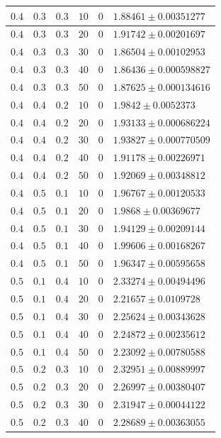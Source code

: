 \documentclass[14pt]{extreport}
\begin{document}
\begin{center}
\begin{longtable}{|p{1cm}|p{1cm}|p{1cm}|p{1cm}|p{1cm}|p{8cm}|}
$0.4$ & $0.3$ & $0.3$ & $10$ & $0$ & $1.88461 \pm 0.00351277$ \\ \hline
$0.4$ & $0.3$ & $0.3$ & $20$ & $0$ & $1.91742 \pm 0.00201697$ \\ \hline
$0.4$ & $0.3$ & $0.3$ & $30$ & $0$ & $1.86504 \pm 0.00102953$ \\ \hline
$0.4$ & $0.3$ & $0.3$ & $40$ & $0$ & $1.86436 \pm 0.000598827$ \\ \hline
$0.4$ & $0.3$ & $0.3$ & $50$ & $0$ & $1.87625 \pm 0.000134616$ \\ \hline
$0.4$ & $0.4$ & $0.2$ & $10$ & $0$ & $1.9842 \pm 0.0052373$ \\ \hline
$0.4$ & $0.4$ & $0.2$ & $20$ & $0$ & $1.93133 \pm 0.000686224$ \\ \hline
$0.4$ & $0.4$ & $0.2$ & $30$ & $0$ & $1.93827 \pm 0.000770509$ \\ \hline
$0.4$ & $0.4$ & $0.2$ & $40$ & $0$ & $1.91178 \pm 0.00226971$ \\ \hline
$0.4$ & $0.4$ & $0.2$ & $50$ & $0$ & $1.92069 \pm 0.00348812$ \\ \hline
$0.4$ & $0.5$ & $0.1$ & $10$ & $0$ & $1.96767 \pm 0.00120533$ \\ \hline
$0.4$ & $0.5$ & $0.1$ & $20$ & $0$ & $1.9868 \pm 0.00369677$ \\ \hline
$0.4$ & $0.5$ & $0.1$ & $30$ & $0$ & $1.94129 \pm 0.00209144$ \\ \hline
$0.4$ & $0.5$ & $0.1$ & $40$ & $0$ & $1.99606 \pm 0.00168267$ \\ \hline
$0.4$ & $0.5$ & $0.1$ & $50$ & $0$ & $1.96347 \pm 0.00595658$ \\ \hline
$0.5$ & $0.1$ & $0.4$ & $10$ & $0$ & $2.33274 \pm 0.00494496$ \\ \hline
$0.5$ & $0.1$ & $0.4$ & $20$ & $0$ & $2.21657 \pm 0.0109728$ \\ \hline
$0.5$ & $0.1$ & $0.4$ & $30$ & $0$ & $2.25624 \pm 0.00343628$ \\ \hline
$0.5$ & $0.1$ & $0.4$ & $40$ & $0$ & $2.24872 \pm 0.00235612$ \\ \hline
$0.5$ & $0.1$ & $0.4$ & $50$ & $0$ & $2.23092 \pm 0.00780588$ \\ \hline
$0.5$ & $0.2$ & $0.3$ & $10$ & $0$ & $2.32951 \pm 0.00889997$ \\ \hline
$0.5$ & $0.2$ & $0.3$ & $20$ & $0$ & $2.26997 \pm 0.00380407$ \\ \hline
$0.5$ & $0.2$ & $0.3$ & $30$ & $0$ & $2.31947 \pm 0.00044122$ \\ \hline
$0.5$ & $0.2$ & $0.3$ & $40$ & $0$ & $2.28689 \pm 0.00363055$ \\ \hline

\end{longtable}
\end{center}
\end{document}
